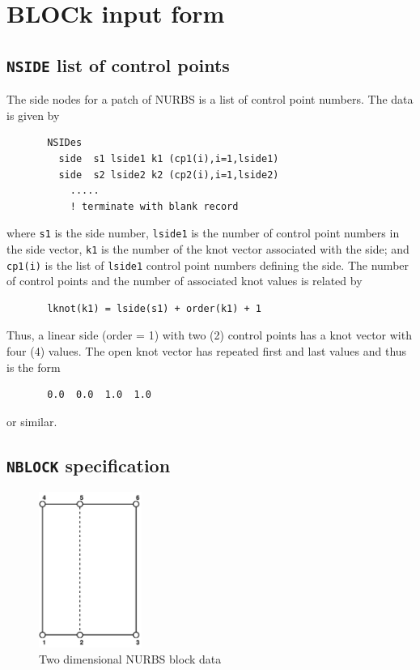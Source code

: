\chapter[BLOCk input form]{BLOCk input form}
\label{appxb}

\section{\texttt{NSIDE} list of control points}

The side nodes for a patch of NURBS is a list of control point numbers.
The data is given by
\setlength{\baselineskip}{12pt}
\begin{verbatim}
       NSIDes
         side  s1 lside1 k1 (cp1(i),i=1,lside1)
         side  s2 lside2 k2 (cp2(i),i=1,lside2)
           .....
           ! terminate with blank record
\end{verbatim}
\setlength{\baselineskip}{14pt}
where \texttt{s1} is the side number, \texttt{lside1} is the number of
control point numbers in the side vector, \texttt{k1} is the number of
the knot vector associated with the side; and
\texttt{cp1(i)} is the list of \texttt{lside1} control point numbers
defining the
side.  The number of control points and the number of associated knot values
is related by
\begin{verbatim}
       lknot(k1) = lside(s1) + order(k1) + 1
\end{verbatim}
Thus, a linear side (order = 1) with two (2) control points has a knot vector
with four (4) values.  The open knot vector has repeated first and last values
and thus is the form
\begin{verbatim}
       0.0  0.0  1.0  1.0
\end{verbatim}
or similar.

\section{\texttt{NBLOCK} specification}

\begin{figure}[b!]
\begin{center}

\includegraphics[height=2in]{figs/nblock2d}

\caption{Two dimensional NURBS block data \label{afig2b} }
\end{center}
\end{figure}

